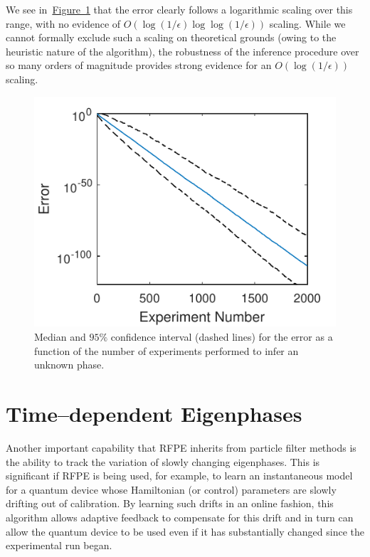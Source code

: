 \documentclass[aps,pra,amsmath,twocolumn,amssymb,superscriptaddress]{revtex4-1}
\newcommand{\fig}[1]{\hyperref[fig:#1]{Figure~\ref*{fig:#1}}}
\begin{document}
{We see in~\fig{small} that the error clearly follows a logarithmic scaling over this range, with no evidence of $O(\log(1/\epsilon)\log\log(1/\epsilon))$ scaling.  While we cannot formally
exclude such a scaling on theoretical grounds (owing to the heuristic nature of the algorithm), the robustness of the inference procedure over so many orders of magnitude provides
strong evidence for an $O(\log(1/\epsilon))$ scaling.


\begin{figure}[t!]
\includegraphics{longPE.pdf}
\caption{Median and $95\%$ confidence interval (dashed lines) for the error as a function of the number of experiments performed to infer an unknown phase.}\label{fig:small}
\end{figure}

\section{Time--dependent Eigenphases}
\label{app:timedep}
Another important capability that RFPE inherits from particle filter methods is the ability to track the variation of slowly changing eigenphases.
This is significant if RFPE is being used, for example, to learn an instantaneous model for a quantum device whose Hamiltonian (or control) parameters
are slowly drifting out of calibration.  By learning such drifts in an online fashion, this algorithm allows adaptive feedback to compensate for this
drift and in turn can allow the quantum device to be used even if it has substantially changed since the experimental run began.

}
\end{document}
